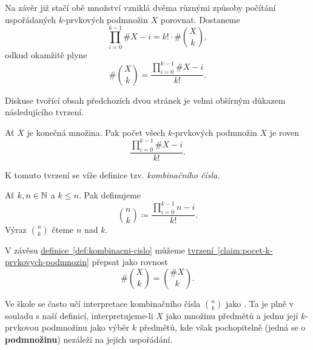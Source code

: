 Na závěr již stačí obě množství vzniklá dvěma různými způsoby počítání
uspořádaných $k$-prvkových podmnožin $X$ porovnat. Dostaneme
\[
 \prod_{i=0}^{k-1} \# X-i = k! \cdot \# \binom{X}{k}, 
\]
odkud okamžitě plyne
\[
 \# \binom{X}{k} = \frac{\prod_{i=0}^{k-1} \# X - i}{k!}.
\]

Diskuse tvořící obsah předchozích dvou stránek je velmi obšírným důkazem
následujícího tvrzení.

\begin{claim}
 \label{claim:pocet-k-prvkovych-podmnozin}
 Ať $X$ je konečná množina. Pak počet všech $k$-prvkových podmnožin $X$ je roven
 \[
  \frac{\prod_{i=0}^{k-1} \# X - i}{k!}.
 \]
\end{claim}

K tomuto tvrzení se víže definice tzv. \emph{kombinačního čísla}.

\begin{definition}
 \label{def:kombinacni-cislo}
 Ať $k,n \in \mathbb{N}$ a $k \leq n$. Pak definujeme
 \[
  \binom{n}{k} \coloneqq \frac{\prod_{i=0}^{k-1} n-i }{k!}.
 \]
 Výraz $\binom{n}{k}$ čteme $n$ nad $k$.
\end{definition}

V závěsu \hyperref[def:kombinacni-cislo]{definice~\ref*{def:kombinacni-cislo}}
můžeme
\hyperref[claim:pocet-k-prvkovych-podmnozin]{tvrzení~\ref*{claim:pocet-k-prvkovych-podmnozin}}
přepsat jako rovnost
\[
 \# \binom{X}{k} = \binom{\# X}{k}.
\]

Ve škole se často učí interpretace kombinačního čísla $\binom{n}{k}$ jako
. Ta je
plně v souladu s naší definicí, interpretujeme-li $X$ jako množinu předmětů a
jednu její $k$-prvkovou podmnožinu jako výběr $k$ předmětů, kde však
pochopitelně (jedná se o \textbf{podmnožinu}) nezáleží na jejich uspořádání.



